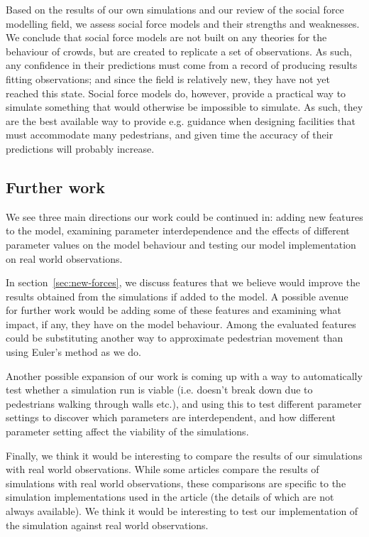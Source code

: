 Based on the results of our own simulations and our review of the social force 
modelling field, we assess social force models and their strengths and 
weaknesses. We conclude that social force models are not built on any theories 
for the behaviour of crowds, but are created to replicate a set of 
observations. As such, any confidence in their predictions must come from a 
record of producing results fitting observations; and since the field is 
relatively new, they have not yet reached this state. Social force models do, 
however, provide a practical way to simulate something that would otherwise be 
impossible to simulate. As such, they are the best available way to provide 
e.g. guidance when designing facilities that must accommodate many 
pedestrians, and given time the accuracy of their predictions will probably 
increase.


\subsection{Further work}
We see three main directions our work could be continued in: adding new 
features to the model, examining parameter interdependence and the effects of 
different parameter values on the model behaviour and testing our model 
implementation on real world observations.

In section~\ref{sec:new-forces}, we discuss features that we believe would 
improve the results obtained from the simulations if added to the model. A 
possible avenue for further work would be adding some of these features and 
examining what impact, if any, they have on the model behaviour. Among the 
evaluated features could be substituting another way to approximate pedestrian 
movement than using Euler's method as we do.

Another possible expansion of our work is coming up with a way to 
automatically test whether a simulation run is viable (i.e. doesn't break down 
due to pedestrians walking through walls etc.), and using this to test 
different parameter settings to discover which parameters are interdependent, 
and how different parameter setting affect the viability of the simulations.

Finally, we think it would be interesting to compare the results of our 
simulations with real world observations. While some articles compare 
the results of simulations with real world observations, these comparisons are 
specific to the simulation implementations used in the article (the details of 
which are not always available). We think it would be interesting to test our 
implementation of the simulation against real world observations.
